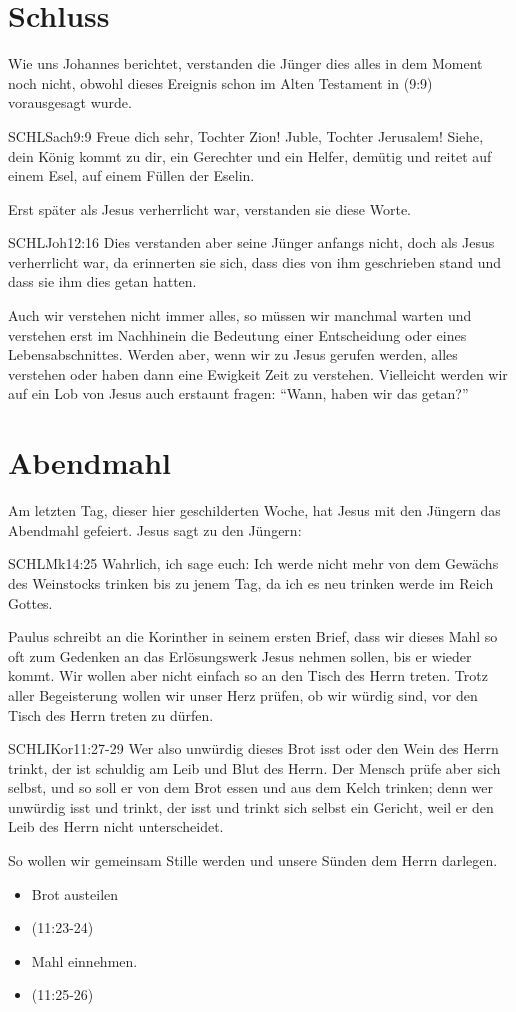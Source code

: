 \documentclass[fontsize=16pt]{mybib}
\begin{document}
    \section{Schluss}
    Wie uns Johannes berichtet, verstanden die Jünger dies alles in dem Moment noch nicht, obwohl dieses Ereignis schon im Alten Testament in (9:9) vorausgesagt wurde.
    \begin{bibelbox}{SCHL}{Sach}{9:9}
    Freue dich sehr, Tochter Zion! Juble, Tochter Jerusalem! Siehe, dein König kommt zu dir, ein Gerechter und ein Helfer, demütig und reitet auf einem Esel, auf einem Füllen der Eselin.
    \end{bibelbox}
    Erst später als Jesus verherrlicht war, verstanden sie diese Worte.
    \begin{bibelbox}{SCHL}{Joh}{12:16}
    Dies verstanden aber seine Jünger anfangs nicht, doch als Jesus verherrlicht war, da erinnerten sie sich, dass dies von ihm geschrieben stand und dass sie ihm dies getan hatten.
    \end{bibelbox}
    
    Auch wir verstehen nicht immer alles, so müssen wir manchmal warten und verstehen erst im Nachhinein die Bedeutung einer Entscheidung oder eines Lebensabschnittes. Werden aber, wenn wir zu Jesus gerufen werden, alles verstehen oder haben dann eine Ewigkeit Zeit zu verstehen. Vielleicht werden wir auf ein Lob von Jesus auch erstaunt fragen: \enquote{Wann, haben wir das getan?}
    
    \section{Abendmahl}
    
    Am letzten Tag, dieser hier geschilderten Woche, hat Jesus mit den Jüngern das Abendmahl gefeiert. Jesus sagt zu den Jüngern:
    \begin{bibelbox}{SCHL}{Mk}{14:25}
    Wahrlich, ich sage euch: Ich werde nicht mehr von dem Gewächs des Weinstocks trinken bis zu jenem Tag, da ich es neu trinken werde im Reich Gottes.
    \end{bibelbox}
    
    Paulus schreibt an die Korinther in seinem ersten Brief, dass wir dieses Mahl so oft zum Gedenken an das Erlösungswerk Jesus nehmen sollen, bis er wieder kommt.
    Wir wollen aber nicht einfach so an den Tisch des Herrn treten. Trotz aller Begeisterung wollen wir unser Herz prüfen, ob wir würdig sind, vor den Tisch des Herrn treten zu dürfen.
    \begin{bibelbox}{SCHL}{IKor}{11:27-29}
    Wer also unwürdig dieses Brot isst oder den Wein des Herrn trinkt, der ist schuldig am Leib und Blut des Herrn. Der Mensch prüfe aber sich selbst, und so soll er von dem Brot essen und aus dem Kelch trinken; denn wer unwürdig isst und trinkt, der isst und trinkt sich selbst ein Gericht, weil er den Leib des Herrn nicht unterscheidet.
    \end{bibelbox}
    So wollen wir gemeinsam Stille werden und unsere Sünden dem Herrn darlegen.
    
    \begin{itemize}
        \item Brot austeilen
        \item {} (11:23-24)
        \item Mahl einnehmen.
        \item {} (11:25-26)
    \end{itemize}
\end{document}
